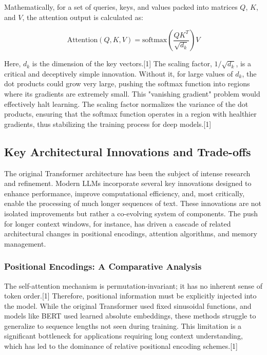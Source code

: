 \documentclass[12pt, a4paper]{article}
\begin{document}
Mathematically, for a set of queries, keys, and values packed into matrices $Q$, $K$, and $V$, the attention output is calculated as:

$$\text{Attention}(Q, K, V) = \text{softmax}\left(\frac{QK^T}{\sqrt{d_k}}\right)V$$

Here, $d_k$ is the dimension of the key vectors.[1] The scaling factor, $1/\sqrt{d_k}$, is a critical and deceptively simple innovation. Without it, for large values of $d_k$, the dot products could grow very large, pushing the softmax function into regions where its gradients are extremely small. This "vanishing gradient" problem would effectively halt learning. The scaling factor normalizes the variance of the dot products, ensuring that the softmax function operates in a region with healthier gradients, thus stabilizing the training process for deep models.[1]

\subsection{Key Architectural Innovations and Trade-offs}

The original Transformer architecture has been the subject of intense research and refinement. Modern LLMs incorporate several key innovations designed to enhance performance, improve computational efficiency, and, most critically, enable the processing of much longer sequences of text. These innovations are not isolated improvements but rather a co-evolving system of components. The push for longer context windows, for instance, has driven a cascade of related architectural changes in positional encodings, attention algorithms, and memory management.

\subsubsection{Positional Encodings: A Comparative Analysis}

The self-attention mechanism is permutation-invariant; it has no inherent sense of token order.[1] Therefore, positional information must be explicitly injected into the model. While the original Transformer used fixed sinusoidal functions, and models like BERT used learned absolute embeddings, these methods struggle to generalize to sequence lengths not seen during training. This limitation is a significant bottleneck for applications requiring long context understanding, which has led to the dominance of relative positional encoding schemes.[1]
\end{document}
